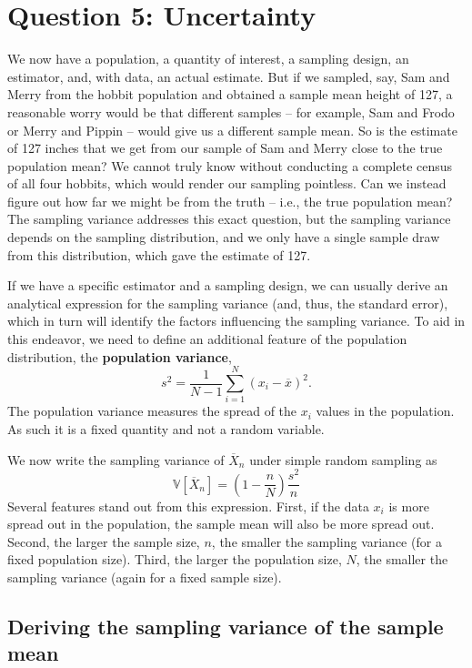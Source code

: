 \documentclass[
  13pt,
  letterpaper,
  DIV=11,
  numbers=noendperiod]{scrreprt}
\newcommand{\V}{\mathbb{V}}
\newcommand{\Xbar}{\overline{X}}
\theoremstyle{plain}
\theoremstyle{plain}
\theoremstyle{definition}
\theoremstyle{definition}
\theoremstyle{remark}
\begin{document}
\section{Question 5: Uncertainty}\label{question-5-uncertainty}

We now have a population, a quantity of interest, a sampling design, an
estimator, and, with data, an actual estimate. But if we sampled, say,
Sam and Merry from the hobbit population and obtained a sample mean
height of 127, a reasonable worry would be that different samples -- for
example, Sam and Frodo or Merry and Pippin -- would give us a different
sample mean. So is the estimate of 127 inches that we get from our
sample of Sam and Merry close to the true population mean? We cannot
truly know without conducting a complete census of all four hobbits,
which would render our sampling pointless. Can we instead figure out how
far we might be from the truth -- i.e., the true population mean? The
sampling variance addresses this exact question, but the sampling
variance depends on the sampling distribution, and we only have a single
sample draw from this distribution, which gave the estimate of 127.

If we have a specific estimator and a sampling design, we can usually
derive an analytical expression for the sampling variance (and, thus,
the standard error), which in turn will identify the factors influencing
the sampling variance. To aid in this endeavor, we need to define an
additional feature of the population distribution, the
\textbf{population variance}, \[
s^{2}= \frac{1}{N-1} \sum_{i=1}^{N} (x_{i} - \overline{x})^{2}.
\] The population variance measures the spread of the \(x_i\) values in
the population. As such it is a fixed quantity and not a random
variable.

We now write the sampling variance of \(\Xbar_n\) under simple random
sampling as \[
\V[\Xbar_{n}] = \left(1 - \frac{n}{N}\right) \frac{s^{2}}{n}
\] Several features stand out from this expression. First, if the data
\(x_i\) is more spread out in the population, the sample mean will also
be more spread out. Second, the larger the sample size, \(n\), the
smaller the sampling variance (for a fixed population size). Third, the
larger the population size, \(N\), the smaller the sampling variance
(again for a fixed sample size).

\subsection{Deriving the sampling variance of the sample
mean}\label{deriving-the-sampling-variance-of-the-sample-mean}
\end{document}
